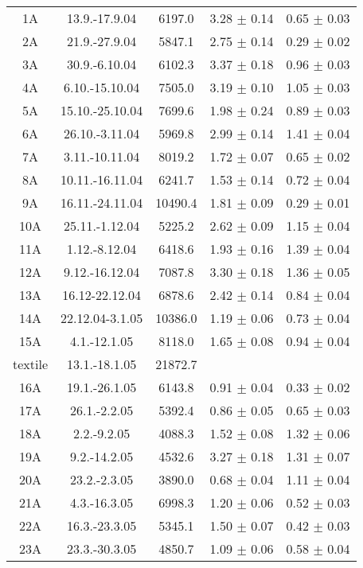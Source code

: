 \documentclass[a4paper,12pt]{article}
\begin{document}
\begin{center}
\begin{longtable}{|c|c|c|c|c|}
    1A	&	13.9.-17.9.04	&	6197.0	&	3.28 $\pm$ 0.14	&	0.65 $\pm$ 0.03	\\
    2A	&	21.9.-27.9.04	&	5847.1	&	2.75 $\pm$ 0.14	&	0.29 $\pm$ 0.02	\\
    3A	&	30.9.-6.10.04	&	6102.3	&	3.37 $\pm$ 0.18	&	0.96 $\pm$ 0.03	\\
    4A	&	6.10.-15.10.04	&	7505.0	&	3.19 $\pm$ 0.10	&	1.05 $\pm$ 0.03	\\
    5A	&	15.10.-25.10.04	&	7699.6	&	1.98 $\pm$ 0.24	&	0.89 $\pm$ 0.03	\\
    6A	&	26.10.-3.11.04	&	5969.8	&	2.99 $\pm$ 0.14	&	1.41 $\pm$ 0.04	\\
    7A	&	3.11.-10.11.04	&	8019.2	&	1.72 $\pm$ 0.07	&	0.65 $\pm$ 0.02	\\
    8A	&	10.11.-16.11.04	&	6241.7	&	1.53 $\pm$ 0.14	&	0.72 $\pm$ 0.04	\\
    9A	&	16.11.-24.11.04	&	10490.4	&	1.81 $\pm$ 0.09	&	0.29 $\pm$ 0.01	\\
    10A	&	25.11.-1.12.04	&	5225.2	&	2.62 $\pm$ 0.09	&	1.15 $\pm$ 0.04	\\
    11A	&	1.12.-8.12.04	&	6418.6	&	1.93 $\pm$ 0.16	&	1.39 $\pm$ 0.04	\\
    12A	&	9.12.-16.12.04	&	7087.8	&	3.30 $\pm$ 0.18	&	1.36 $\pm$ 0.05	\\
    13A	&	16.12-22.12.04	&	6878.6	&	2.42 $\pm$ 0.14	&	0.84 $\pm$ 0.04	\\
    14A	&	22.12.04-3.1.05	&	10386.0	&	1.19 $\pm$ 0.06	&	0.73 $\pm$ 0.04	\\
    15A	&	4.1.-12.1.05	&	8118.0	&	1.65 $\pm$ 0.08	&	0.94 $\pm$ 0.04	\\
    textile	&	13.1.-18.1.05	&	21872.7	&		&		\\
    16A	&	19.1.-26.1.05	&	6143.8	&	0.91 $\pm$ 0.04	&	0.33 $\pm$ 0.02	\\
    17A	&	26.1.-2.2.05	&	5392.4	&	0.86 $\pm$ 0.05	&	0.65 $\pm$ 0.03	\\
    18A	&	2.2.-9.2.05	&	4088.3	&	1.52 $\pm$ 0.08	&	1.32 $\pm$ 0.06	\\
    19A	&	9.2.-14.2.05	&	4532.6	&	3.27 $\pm$ 0.18	&	1.31 $\pm$ 0.07	\\
    20A	&	23.2.-2.3.05	&	3890.0	&	0.68 $\pm$ 0.04	&	1.11 $\pm$ 0.04	\\
    21A	&	4.3.-16.3.05	&	6998.3	&	1.20 $\pm$ 0.06	&	0.52 $\pm$ 0.03	\\
    22A	&	16.3.-23.3.05	&	5345.1	&	1.50 $\pm$ 0.07	&	0.42 $\pm$ 0.03	\\
    23A	&	23.3.-30.3.05	&	4850.7	&	1.09 $\pm$ 0.06	&	0.58 $\pm$ 0.04	\\

\end{longtable}
\end{center}
\end{document}
